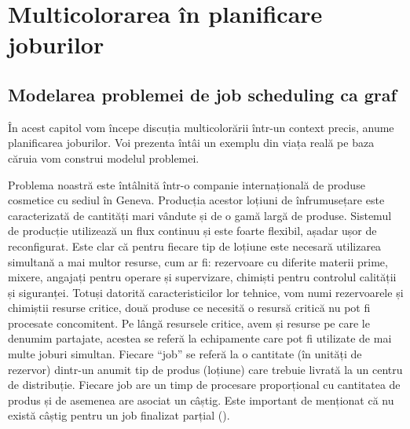 
\chapter{Multicolorarea în planificare joburilor}\label{cap:multicolorare}

\section{Modelarea problemei de job scheduling ca graf}
 
    În acest capitol vom începe discuția multicolorării într-un context precis, anume planificarea joburilor. Voi prezenta întâi un exemplu din viața reală pe baza căruia vom construi modelul problemei. 
    
    Problema noastră este întâlnită într-o companie internațională de produse cosmetice cu sediul în Geneva. Producția acestor loțiuni de înfrumusețare este caracterizată de cantități mari vândute și de o gamă largă de produse. Sistemul de producție utilizează un flux continuu și este foarte flexibil, așadar ușor de reconfigurat. Este clar că pentru fiecare tip de loțiune este necesară utilizarea simultană a mai multor resurse, cum ar fi: rezervoare cu diferite materii prime, mixere, angajați pentru operare și supervizare, chimiști pentru controlul calității și siguranței. Totuși datorită caracteristicilor lor tehnice, vom numi rezervoarele și chimiștii resurse critice, două produse ce necesită o resursă critică nu pot fi procesate concomitent. Pe lângă resursele critice,  avem și resurse pe care le denumim partajate, acestea se referă la echipamente care pot fi utilizate de mai multe joburi simultan.  Fiecare ``job'' se referă la o cantitate (în unități de rezervor) dintr-un anumit tip de produs (loțiune) care trebuie livrată la un centru de distribuție. Fiecare job are un timp de procesare proporțional cu cantitatea de produs și de asemenea are asociat un câștig. Este important de menționat că nu există câștig pentru un job finalizat parțial (\cite{thevenin2016graph}).

  



